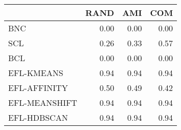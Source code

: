 \begin{tabular}{lrrr}
\toprule
 & RAND & AMI & COM \\
\midrule
BNC & 0.00 & 0.00 & 0.00 \\
SCL & 0.26 & 0.33 & 0.57 \\
BCL & 0.00 & 0.00 & 0.00 \\
EFL-KMEANS & 0.94 & 0.94 & 0.94 \\
EFL-AFFINITY & 0.50 & 0.49 & 0.42 \\
EFL-MEANSHIFT & 0.94 & 0.94 & 0.94 \\
EFL-HDBSCAN & 0.94 & 0.94 & 0.94 \\
\bottomrule
\end{tabular}
